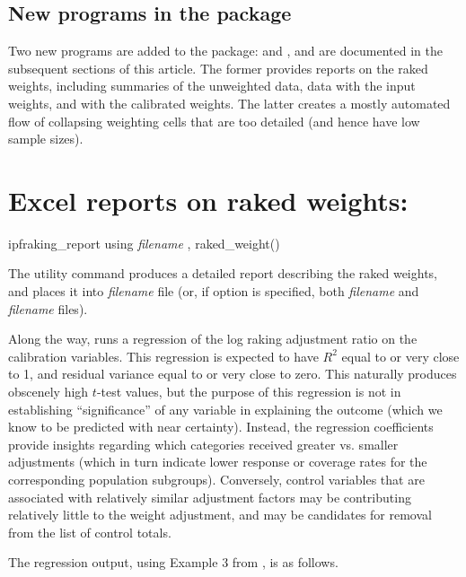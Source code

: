 \subsection{New programs in the package}

Two new programs are added to the package:  and ,
and are documented in the subsequent sections of this article. The former provides reports on the raked weights,
including summaries of the unweighted data, data with the input weights, and with the calibrated weights.
The latter creates a mostly automated flow of collapsing weighting cells that are too detailed
(and hence have low sample sizes).

\section{Excel reports on raked weights:  }

\begin{stsyntax}
ipfraking\_report
using \textit{filename}
,
raked\_weight(\varname)
\end{stsyntax}

The utility command  produces a detailed report
describing the raked weights, and places it into \textit{filename} file
(or, if  option is specified, both \textit{filename} and \textit{filename}
files).

Along the way,  runs a regression of the log raking adjustment ratio
on the calibration variables. This regression is expected to have $R^2$ equal to or very close to 1,
and residual variance equal to or very close to zero. This naturally produces obscenely
high $t$-test values, but the purpose of this regression is not in establishing
``significance'' of any variable in explaining the outcome (which we know to be predicted
with near certainty).
Instead, the regression coefficients provide insights regarding which categories received
greater vs. smaller adjustments (which in turn indicate lower response or coverage rates
for the corresponding population subgroups). Conversely, control variables that are
associated with relatively similar adjustment factors may be contributing relatively
little to the weight adjustment, and may be candidates for removal from the list of control totals.

The regression output, using Example 3 from \citet{kolenikov:2014}, is as follows.
\label{page:regress}

